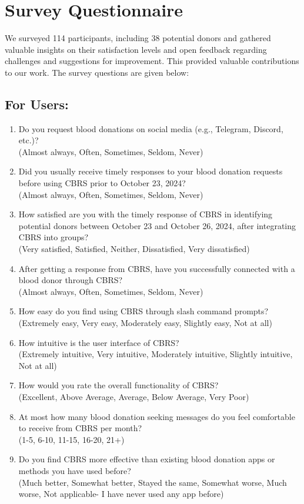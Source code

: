 \documentclass[11pt]{article}
\begin{document}
\section{Survey Questionnaire}\label{appendix:C}
We surveyed 114 participants, including 38 potential donors and gathered valuable insights on their satisfaction levels and open feedback regarding challenges and suggestions for improvement. This provided valuable contributions to our work. The survey questions are given below:
\subsection*{For Users:}
\begin{enumerate}
    \item Do you request blood donations on social media (e.g., Telegram, Discord, etc.)?\\
    (Almost always, Often, Sometimes, Seldom, Never)
    
    \item Did you usually receive timely responses to your blood donation requests before using CBRS prior to October 23, 2024?\\
    (Almost always, Often, Sometimes, Seldom, Never)

\item How satisfied are you with the timely response of CBRS in identifying potential donors between October 23 and October 26, 2024, after integrating CBRS into groups?\\(Very satisfied, Satisfied, Neither, Dissatisfied, Very dissatisfied)

      \item After getting a response from CBRS, have you successfully connected with a blood donor through CBRS?\\
    (Almost always, Often, Sometimes, Seldom, Never)

    \item How easy do you find using CBRS through slash command prompts?\\
    (Extremely easy, Very easy, Moderately easy, Slightly easy, Not at all)
    \item How intuitive is the user interface of CBRS?\\
    (Extremely intuitive, Very intuitive, Moderately intuitive, Slightly intuitive, Not at all)
    \item How would you rate the overall functionality of CBRS?\\
    (Excellent, Above Average, Average, Below Average, Very Poor)
    \item At most how many blood donation seeking messages do you feel comfortable to receive from CBRS per month?\\
    (1-5, 6-10, 11-15, 16-20, 21+)
    \item Do you find CBRS more effective than existing blood donation apps or methods you have used before?\\
    (Much better, Somewhat better, Stayed the same, Somewhat worse, Much worse, Not applicable- I have never used any app before)


\end{enumerate}
\end{document}
